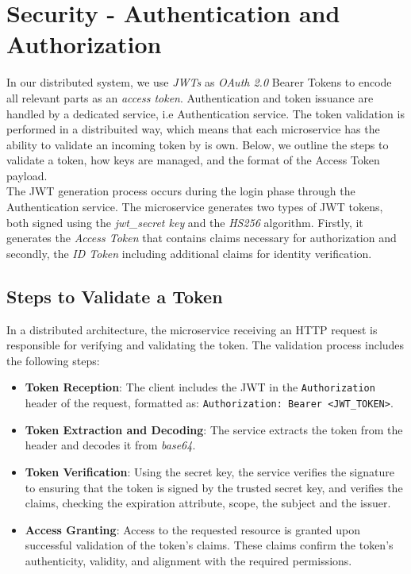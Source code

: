 \documentclass{article}
\begin{document}
\section{Security - Authentication and Authorization}
In our distributed system, we use \emph{JWTs} as \emph{OAuth 2.0} Bearer Tokens to encode all relevant parts as an \emph{access token}. Authentication and token issuance are handled by a dedicated service, i.e Authentication service. The token validation is performed in a distribuited way, which means that each microservice has the ability to validate an incoming token by is own. Below, we outline the steps to validate a token, how keys are managed, and the format of the Access Token payload. \\
The JWT generation process occurs during the login phase through the Authentication service. The microservice generates two types of JWT tokens, both signed using the \emph{jwt\_secret key} and the \emph{HS256} algorithm. Firstly, it generates the \emph{Access Token} that contains claims necessary for authorization and secondly, the \emph{ID Token} including additional claims for identity verification.
\subsection{Steps to Validate a Token}
In a distributed architecture, the microservice receiving an HTTP request is responsible for verifying and validating the token. The validation process includes the following steps:
\begin{itemize}
    \item \textbf{Token Reception}: The client includes the JWT in the \texttt{Authorization} header of the request, formatted as: \texttt{Authorization: Bearer <JWT\_TOKEN>}.
    \item \textbf{Token Extraction and Decoding}: The service extracts the token from the header and decodes it from \emph{base64}.
    \item \textbf{Token Verification}: Using the secret key, the service verifies the signature to ensuring that the token is signed by the trusted secret key, and verifies the claims, checking the expiration attribute, scope, the subject and the issuer.
    \item \textbf{Access Granting}: Access to the requested resource is granted upon successful validation of the token's claims. These claims confirm the token's authenticity, validity, and alignment with the required permissions.
\end{itemize}
\end{document}
